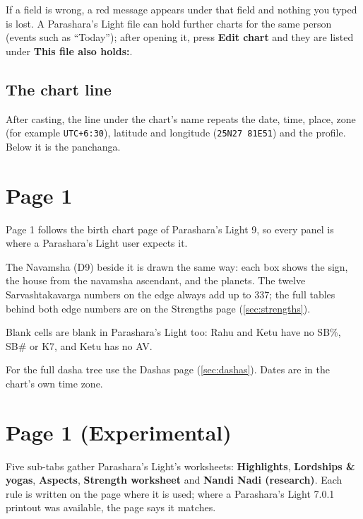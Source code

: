 \documentclass[11pt, a4paper]{article}
\newcommand{\shot}[1]{}
\newcommand{\PL}{Parashara's Light}
\newcommand{\ui}[1]{\textbf{\textsf{#1}}}   %
\newcommand{\ex}[1]{\texttt{#1}}             %
\begin{document}
If a field is wrong, a red message appears under that field and nothing you typed is lost. A \PL{} file
can hold further charts for the same person (events such as ``Today''); after opening it, press
\ui{Edit chart} and they are listed under \ui{This file also holds:}.

\subsection{The chart line}
After casting, the line under the chart's name repeats the date, time, place, zone (for example
\ex{UTC+6:30}), latitude and longitude (\ex{25N27 81E51}) and the profile. Below it is the panchanga.

\shot{chartline}

\section{Page 1}
\label{sec:page1}
Page 1 follows the birth chart page of \PL{} 9, so every panel is where a \PL{} user expects it.

\shot{p1rasi}

The Navamsha (D9) beside it is drawn the same way: each box shows the sign, the house from the navamsha
ascendant, and the planets. The twelve Sarvashtakavarga numbers on the edge always add up to 337; the full
tables behind both edge numbers are on the Strengths page (\autoref{sec:strengths}).

\shot{p1planets}
\shot{p1strength}

\begin{notebox}Blank cells are blank in \PL{} too: Rahu and Ketu have no SB\%, SB\# or K7, and Ketu has no
AV.\end{notebox}

\shot{p1vim}

For the full dasha tree use the Dashas page (\autoref{sec:dashas}). Dates are in the chart's own time zone.

\shot{p1bars}
\shot{p1how}

\section{Page 1 (Experimental)}
\label{sec:exp}
Five sub-tabs gather \PL{}'s worksheets: \ui{Highlights}, \ui{Lordships \& yogas}, \ui{Aspects},
\ui{Strength worksheet} and \ui{Nandi Nadi (research)}. Each rule is written on the page where it is
used; where a \PL{} 7.0.1 printout was available, the page says it matches.
\end{document}
